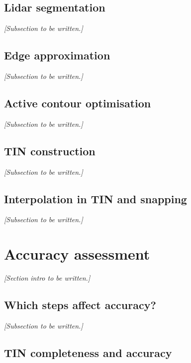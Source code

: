 \subsection{Lidar segmentation}
\label{sub:r_lidarsegmentation}

\textit{[Subsection to be written.]}

\subsection{Edge approximation}
\label{sub:r_edgeapproximation}

\textit{[Subsection to be written.]}

\subsection{Active contour optimisation}
\label{sub:r_activecontours}

\textit{[Subsection to be written.]}

\subsection{TIN construction}
\label{sub:r_tinconstruction}

\textit{[Subsection to be written.]}

\subsection{Interpolation in TIN and snapping}
\label{sub:r_interpolation}

\textit{[Subsection to be written.]}

\section{Accuracy assessment}
\label{sec:accuracy}

\textit{[Section intro to be written.]}

\subsection{Which steps affect accuracy?}
\label{sub:accuracysteps}

\textit{[Subsection to be written.]}

\subsection{TIN completeness and accuracy}
\label{sub:accuracytin}

